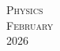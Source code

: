\documentclass[10pt,dvipsnames]{article} %
\begin{document}
\begin{calendar}{\textwidth}
\day{}{} 

\day{}{}

\day{}{\vspace{2.5cm}} 

\day{}{}  

\day{}{\vspace{2.5cm}} 

\day{}{\vspace{2.5cm}} 


\finishCalendar
\end{calendar}

\clearpage

\begin{center}
        \textsc{Physics}\\
	\textsc{\LARGE February}\\
	\textsc{\large 2026}
\end{center}
\end{document}
